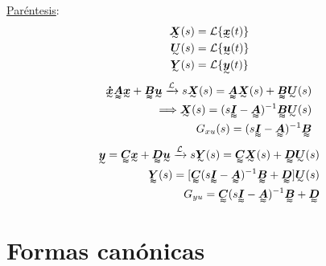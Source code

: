 \underline{Paréntesis}:
\begin{align*}
    \tend{X}(s)&=\mathcal{L}\{\tend{x}(t)\}\\
    \tend{U}(s)&=\mathcal{L}\{\tend{u}(t)\}\\
    \tend{Y}(s)&=\mathcal{L}\{\tend{y}(t)\}
\end{align*}
\begin{align*}
    \tend{\dot{x}}\tenq{A}\tend{x}+\tenq{B}\tend{u}\xrightarrow[]{\mathcal{L}}s\tend{X}(s)=\tenq{A}\tend{X}(s)+\tenq{B}\tend{U}(s)\\
    \Longrightarrow \tend{X}(s)=(s\tenq{I}-\tenq{A})^{-1}\tenq{B}\tend{U}(s)\\
    G_{xu}(s)=(s\tenq{I}-\tenq{A})^{-1}\tenq{B}
\end{align*}
\begin{align*}
    \tend{y}=\tenq{C}\tend{x}+\tenq{D}\tend{u}\xrightarrow[]{\mathcal{L}}s\tend{Y}(s)=\tenq{C}\tend{X}(s)+\tenq{D}\tend{U}(s)\\
    \tenq{Y}(s)=[\tenq{C}(s\tenq{I}-\tenq{A})^{-1}\tenq{B}+\tenq{D}]\tend{U}(s)\\
    G_{yu}=\tenq{C}(s\tenq{I}-\tenq{A})^{-1}\tenq{B}+\tenq{D}
\end{align*}


\section{Formas canónicas}
